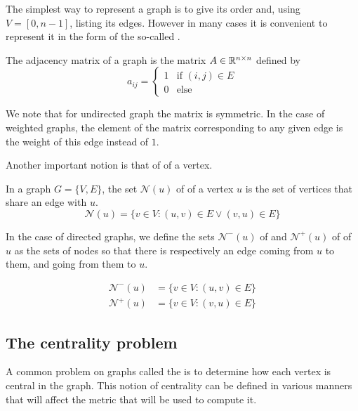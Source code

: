 The simplest way to represent a graph is to give its order and, using $V = [0, n-1]$, listing its edges. However in many cases it is convenient to represent it in the form of the so-called .

\begin{definition}
    The adjacency matrix of a graph is the matrix $A \in \mathbb{R}^{n\times n}$ defined by
    $$
    a_{ij} = \begin{cases}
        1 & \text{if $(i, j) \in E$}\\
        0 & \text{else}
    \end{cases}$$
\end{definition}

We note that for undirected graph the matrix is symmetric. In the case of weighted graphs, the element of the matrix corresponding to any given edge is the weight of this edge instead of $1$.

Another important notion is that of  of a vertex.
\begin{definition}[Neighbors]
    In a graph $G = \{V, E\}$, the set $\mathcal{N}(u)$ of  of a vertex $u$ is the set of vertices that share an edge with $u$.
    \begin{equation}
        \mathcal{N}(u) = \{v\in V : (u, v) \in E \vee (v, u) \in E\}
    \end{equation}

    In the case of directed graphs, we define the sets $\mathcal{N}^-(u)$ of  and $\mathcal{N}^+(u)$ of  of $u$ as the sets of nodes so that there is respectively an edge coming from $u$ to them, and going from them to $u$.

    \begin{equation}
        \begin{array}{ll}
            \mathcal{N}^-(u) & = \{v\in V : (u, v) \in E\} \\
            \mathcal{N}^+(u) & = \{v\in V : (v, u) \in E\}
        \end{array}
    \end{equation}
\end{definition}

\subsection{The centrality problem}\label{subsec:Intro_centrality}
A common problem on graphs called the  is to determine how each vertex is central in the graph. This notion of centrality can be defined in various manners that will affect the metric that will be used to compute it.


